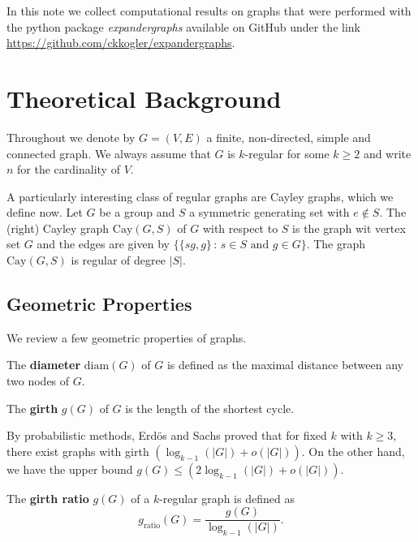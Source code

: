 

In this note we collect computational results on graphs that were performed with the python package \textit{expandergraphs} available on GitHub under the link \url{https://github.com/ckkogler/expandergraphs}.

\section{Theoretical Background}

Throughout we denote by $G = (V,E)$ a finite, non-directed, simple and connected graph. We always assume that $G$ is $k$-regular for some $k \geq 2$ and write $n$ for the cardinality of $V$.

A particularly interesting class of regular graphs are Cayley graphs, which we define now. Let $G$ be a group and $S$ a symmetric generating set with $e \not \in S$.  The (right) Cayley graph $\mathrm{Cay}(G,S)$ of $G$ with respect to $S$ is the graph wit vertex set $G$  and the edges are given by $\{ \{ sg, g \} \,:\, s \in S \text{ and } g \in G  \}$. The graph $\mathrm{Cay}(G,S)$ is regular of degree $|S|$.

\subsection{Geometric Properties}

We review a few geometric properties of graphs. 

\begin{definition}
	The \textbf{diameter} $\mathrm{diam}(G)$ of $G$ is defined as the maximal distance between any two nodes of $G$. 
\end{definition} 
 
 \begin{definition}
 	The \textbf{girth} $g(G)$ of $G$ is the length of the shortest cycle. 
 \end{definition}

By probabilistic methods, Erdös and Sachs \cite{ErdosSachs1963} proved that for fixed $k$ with $k \geq 3$, there exist graphs with girth $(\log_{k-1}(|G|) + o(|G|)).$ On the other hand, we have the upper bound $g(G) \leq (2\log_{k-1}(|G|) + o(|G|))$.

\begin{definition}
	The \textbf{girth ratio} $g(G)$ of a $k$-regular graph is defined as $$g_{\mathrm{ratio}}(G) = \frac{g(G)}{\log_{k-1}(|G|)}.$$
\end{definition}

